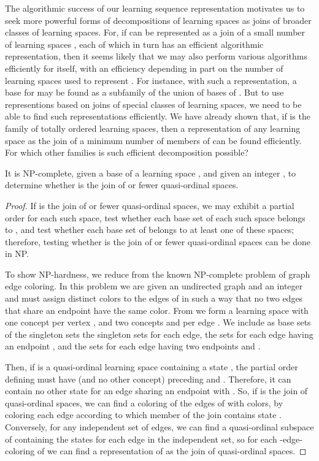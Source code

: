 \documentclass[11pt]{llncs}
\begin{document}
{The algorithmic success of our learning sequence representation motivates us to seek more powerful forms of decompositions of learning spaces as joins of broader classes of learning spaces.
For, if  can be represented as a join of a small number of learning spaces , each of which in turn has an efficient algorithmic representation, then it seems likely that we may also perform
various algorithms efficiently for  itself, with an efficiency depending in part on the number  of learning spaces used to represent . For instance, with such a representation, a base for  may be found as a subfamily of the union of bases of . But to use representions based on joins of special classes of learning spaces, we need to be able to find such representations efficiently. We have already shown that, if  is the family of totally ordered learning spaces, then a representation of any learning space as the join of a minimum number of members of  can be found efficiently. For which other families  is such efficient decomposition possible?

\begin{theorem}
It is NP-complete, given a base  of a learning space , and given an integer , to determine whether  is the join of  or fewer quasi-ordinal spaces.
\end{theorem}

\begin{proof}
If  is the join of  or fewer quasi-ordinal spaces, we may exhibit a partial order for each such space, test whether each base set of each such space belongs to , and test whether each base set of  belongs to at least one of these spaces; therefore, testing whether   is the join of  or fewer quasi-ordinal spaces can be done in NP.

To show NP-hardness, we reduce from the known NP-complete problem of graph edge coloring.
In this problem we are given an undirected graph  and an integer  and must assign  distinct colors to the edges of  in such a way that no two edges that share an endpoint have the same color.
From  we form a learning space  with one concept per vertex , and two concepts  and  per edge . We include as base sets of  the singleton sets the singleton sets  for each edge, the sets  for each edge  having an endpoint , and the sets  for each edge  having two endpoints  and .

Then, if  is a quasi-ordinal learning space containing a state , the partial order defining  must have  (and no other concept) preceding  and .
Therefore, it can contain no other state  for an edge  sharing an endpoint with . So, if  is the join of  quasi-ordinal spaces, we can find a coloring of the edges of  with  colors, by coloring each edge according to which member of the join contains state  .  Conversely, for any independent set of edges, we can find a quasi-ordinal subspace of  containing the states   for each edge in the independent set, so for each -edge-coloring of  we can find a representation of  as the join of  quasi-ordinal spaces.


\end{proof}}
\end{document}
